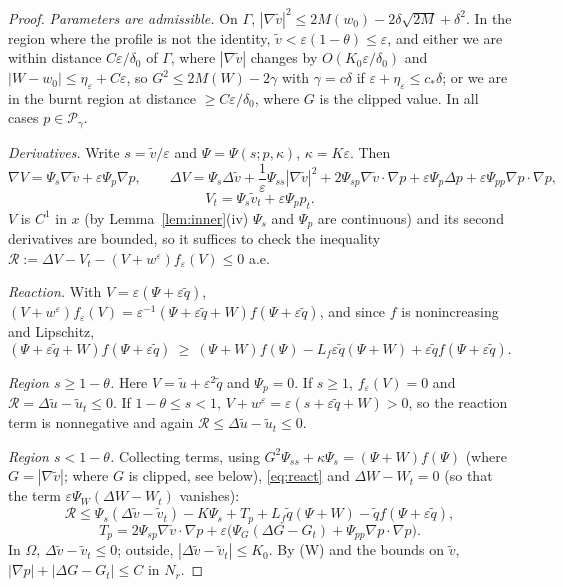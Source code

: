 \documentclass[11pt]{amsart}
\theoremstyle{definition}
\theoremstyle{remark}
\newcommand{\ve}{\varepsilon}
\begin{document}
\begin{proof}
\emph{Parameters are admissible.} On $\Gamma$, $|\nabla\tilde v|^2\le2M(w_0)-2\delta\sqrt{2M}+\delta^2$.
In the region where the profile is not the identity, $\tilde v<\ve(1-\theta)\le\ve$,
and either we are within distance $C\ve/\delta_0$ of $\Gamma$, where
$|\nabla\tilde v|$ changes by $O(K_0\ve/\delta_0)$ and $|W-w_0|\le\eta_\ve+C\ve$, so
$G^2\le2M(W)-2\gamma$ with $\gamma=c\delta$ if $\ve+\eta_\ve\le c_*\delta$; or we are in
the burnt region at distance $\ge C\ve/\delta_0$, where $G$ is the clipped value.
In all cases $p\in\mathcal P_\gamma$.

\emph{Derivatives.} Write $s=\tilde v/\ve$ and $\Psi=\Psi(s;p,\kappa)$, $\kappa=K\ve$.
Then
\[
\nabla V=\Psi_s\nabla\tilde v+\ve\Psi_p\nabla p,\qquad
\Delta V=\Psi_s\Delta\tilde v+\frac{1}{\ve}\Psi_{ss}|\nabla\tilde v|^2+2\Psi_{sp}\nabla\tilde v\cdot\nabla p
+\ve\Psi_p\Delta p+\ve\Psi_{pp}\nabla p\cdot\nabla p,
\]
\[
V_t=\Psi_s\tilde v_t+\ve\Psi_p p_t .
\]
$V$ is $C^1$ in $x$ (by Lemma~\ref{lem:inner}(iv) $\Psi_s$ and $\Psi_p$ are continuous)
and its second derivatives are bounded, so it suffices to check the
inequality $\mathcal R:=\Delta V-V_t-(V+w^\ve)f_\ve(V)\le0$ a.e.

\emph{Reaction.} With $V=\ve(\Psi+\ve\tilde q)$,
$(V+w^\ve)f_\ve(V)=\ve^{-1}(\Psi+\ve\tilde q+W)f(\Psi+\ve\tilde q)$, and since $f$ is
nonincreasing and Lipschitz,
\begin{equation}\label{eq:react}
(\Psi+\ve\tilde q+W)f(\Psi+\ve\tilde q)\ \ge\ (\Psi+W)f(\Psi)-L_f\ve\tilde q(\Psi+W)+\ve\tilde qf(\Psi+\ve\tilde q).
\end{equation}

\emph{Region $s\ge1-\theta$.} Here $V=\tilde u+\ve^2\tilde q$ and $\Psi_p=0$. If
$s\ge1$, $f_\ve(V)=0$ and $\mathcal R=\Delta\tilde u-\tilde u_t\le0$. If
$1-\theta\le s<1$, $V+w^\ve=\ve(s+\ve\tilde q+W)>0$, so the reaction term is
nonnegative and again $\mathcal R\le\Delta\tilde u-\tilde u_t\le0$.

\emph{Region $s<1-\theta$.} Collecting terms, using
$G^2\Psi_{ss}+\kappa\Psi_s=(\Psi+W)f(\Psi)$ (where $G=|\nabla\tilde v|$; where $G$ is
clipped, see below), \eqref{eq:react} and $\Delta W-W_t=0$ (so that the term
$\ve\Psi_W(\Delta W-W_t)$ vanishes):
\[
\mathcal R\le\Psi_s(\Delta\tilde v-\tilde v_t)-K\Psi_s+T_p+L_f\tilde q(\Psi+W)-\tilde qf(\Psi+\ve\tilde q),
\]
\[
T_p=2\Psi_{sp}\nabla\tilde v\cdot\nabla p+\ve\big(\Psi_G(\Delta G-G_t)+\Psi_{pp}\nabla p\cdot\nabla p\big).
\]
In $\Omega$, $\Delta\tilde v-\tilde v_t\le0$; outside, $|\Delta\tilde v-\tilde v_t|\le K_0$.
By (W) and the bounds on $\tilde v$, $|\nabla p|+|\Delta G-G_t|\le C$ in $N_r$.


\end{proof}
\end{document}
